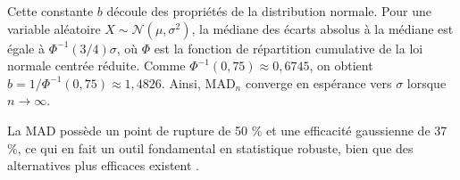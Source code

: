  Cette constante $b$ découle des propriétés de la distribution normale. Pour une variable aléatoire $X \sim \mathcal{N}(\mu, \sigma^2)$, la médiane des écarts absolus à la médiane est égale à $\Phi^{-1}(3/4) \sigma$, où $\Phi$ est la fonction de répartition cumulative de la loi normale centrée réduite. Comme $\Phi^{-1}(0,75) \approx 0,6745$, on obtient $b = 1 / \Phi^{-1}(0,75) \approx 1,4826$. Ainsi, $\text{MAD}_n$ converge en espérance vers $\sigma$ lorsque $n \to \infty$.
 
 La MAD possède un point de rupture de 50 \% et une efficacité gaussienne de 37 \%, ce qui en fait un outil fondamental en statistique robuste, bien que des alternatives plus efficaces existent \citep{rousseeuw1993alternatives}.